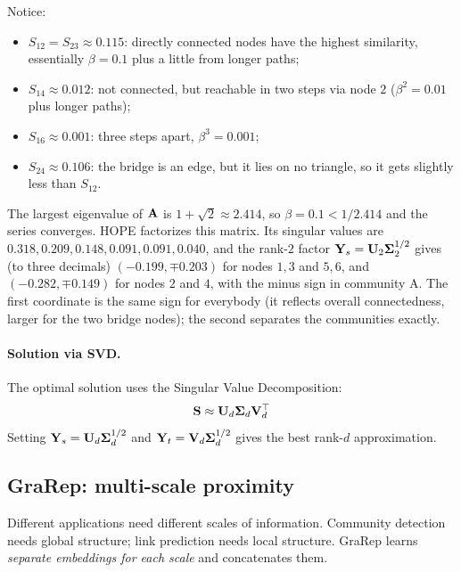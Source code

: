\begin{notechapter}
\begin{example}
Notice:
\begin{itemize}
    \item $S_{12} = S_{23} \approx 0.115$: directly connected nodes have the highest similarity, essentially $\beta = 0.1$ plus a little from longer paths;
    \item $S_{14} \approx 0.012$: not connected, but reachable in two steps via node $2$ ($\beta^2 = 0.01$ plus longer paths);
    \item $S_{16} \approx 0.001$: three steps apart, $\beta^3 = 0.001$;
    \item $S_{24} \approx 0.106$: the bridge is an edge, but it lies on no triangle, so it gets slightly less than $S_{12}$.
\end{itemize}

The largest eigenvalue of $\mathbf{A}$ is $1 + \sqrt2 \approx 2.414$, so $\beta = 0.1 < 1/2.414$ and the series converges. HOPE factorizes this matrix. Its singular values are $0.318, 0.209, 0.148, 0.091, 0.091, 0.040$, and the rank-$2$ factor $\mathbf{Y}_s = \mathbf U_2\mathbf\Sigma_2^{1/2}$ gives (to three decimals) $(-0.199, \mp0.203)$ for nodes $1, 3$ and $5, 6$, and $(-0.282, \mp0.149)$ for nodes $2$ and $4$, with the minus sign in community A. The first coordinate is the same sign for everybody (it reflects overall connectedness, larger for the two bridge nodes); the second separates the communities exactly.
\end{example}

\paragraph{Solution via SVD.} The optimal solution uses the Singular Value Decomposition:
\[
\mathbf{S} \approx \mathbf{U}_d \mathbf{\Sigma}_d \mathbf{V}_d^\top
\]
Setting $\mathbf{Y}_s = \mathbf{U}_d \mathbf{\Sigma}_d^{1/2}$ and $\mathbf{Y}_t = \mathbf{V}_d \mathbf{\Sigma}_d^{1/2}$ gives the best rank-$d$ approximation.

\subsection{GraRep: multi-scale proximity}

\begin{intuition}[Motivation]
Different applications need different scales of information. Community detection needs global structure; link prediction needs local structure.
GraRep learns \emph{separate embeddings for each scale} and concatenates them.
\end{intuition}


\end{notechapter}
